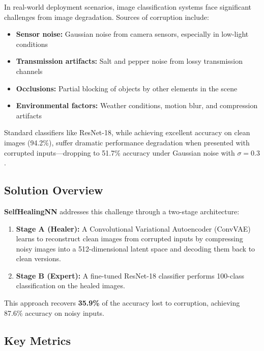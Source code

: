 \documentclass[11pt,a4paper]{article}
\begin{document}
In real-world deployment scenarios, image classification systems face significant challenges from image degradation. Sources of corruption include:

\begin{itemize}[noitemsep]
    \item \textbf{Sensor noise:} Gaussian noise from camera sensors, especially in low-light conditions
    \item \textbf{Transmission artifacts:} Salt and pepper noise from lossy transmission channels
    \item \textbf{Occlusions:} Partial blocking of objects by other elements in the scene
    \item \textbf{Environmental factors:} Weather conditions, motion blur, and compression artifacts
\end{itemize}

Standard classifiers like ResNet-18, while achieving excellent accuracy on clean images (94.2\%), suffer dramatic performance degradation when presented with corrupted inputs---dropping to 51.7\% accuracy under Gaussian noise with $\sigma=0.3$.

\subsection{Solution Overview}

\textbf{SelfHealingNN} addresses this challenge through a two-stage architecture:

\begin{enumerate}
    \item \textbf{Stage A (Healer):} A Convolutional Variational Autoencoder (ConvVAE) learns to reconstruct clean images from corrupted inputs by compressing noisy images into a 512-dimensional latent space and decoding them back to clean versions.

    \item \textbf{Stage B (Expert):} A fine-tuned ResNet-18 classifier performs 100-class classification on the healed images.
\end{enumerate}

This approach recovers \textbf{35.9\%} of the accuracy lost to corruption, achieving 87.6\% accuracy on noisy inputs.

\subsection{Key Metrics}
\end{document}
